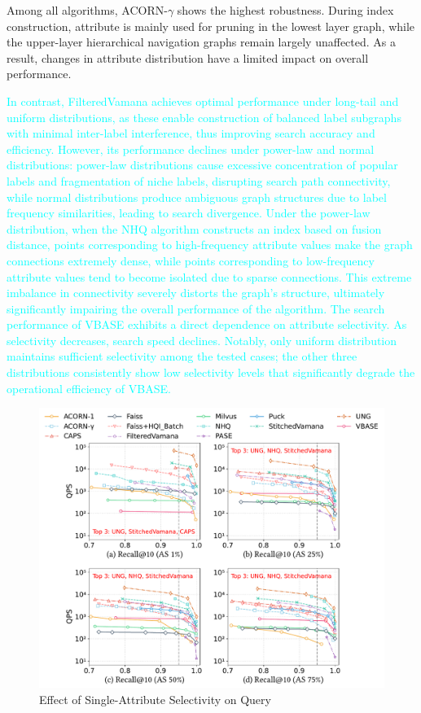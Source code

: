 \documentclass[sigconf, nonacm]{acmart}
\begin{document}
	Among all algorithms, ACORN-\(\gamma\) shows the highest robustness. During index construction, attribute is mainly used for pruning in the lowest layer graph, while the upper-layer hierarchical navigation graphs remain largely unaffected. As a result, changes in attribute distribution have a limited impact on overall performance.
	
	\textcolor{cyan}{In contrast, FilteredVamana achieves optimal performance under long-tail and uniform distributions, as these enable construction of balanced label subgraphs with minimal inter-label interference, thus improving search accuracy and efficiency. However, its performance declines under power-law and normal distributions: power-law distributions cause excessive concentration of popular labels and fragmentation of niche labels, disrupting search path connectivity, while normal distributions produce ambiguous graph structures due to label frequency similarities, leading to search divergence. 
	Under the power-law distribution, when the NHQ algorithm constructs an index based on fusion distance, points corresponding to high-frequency attribute values make the graph connections extremely dense, while points corresponding to low-frequency attribute values tend to become isolated due to sparse connections. This extreme imbalance in connectivity severely distorts the graph's structure, ultimately significantly impairing the overall performance of the algorithm.
	The search performance of VBASE exhibits a direct dependence on attribute selectivity. As selectivity decreases, search speed declines. Notably, only uniform distribution maintains sufficient selectivity among the tested cases; the other three distributions consistently show low selectivity levels that significantly degrade the operational efficiency of VBASE.}
	
	\begin{figure}
		\centering
		\setlength{\abovecaptionskip}{0.1cm}
		\setlength{\belowcaptionskip}{-0.1cm}
		\includegraphics[width=0.95\columnwidth]{figures/exp/exp_5_1_1_SingleLabel_1thread.pdf}
		\caption{Effect of Single-Attribute Selectivity on Query}
		\label{fig:exp_5_1_1_SingleLabel_1thread}
	\end{figure}
	
\end{document}

